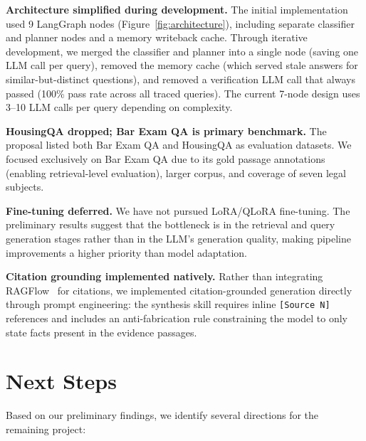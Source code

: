\documentclass{article}
\begin{document}
\textbf{Architecture simplified during development.}
The initial implementation used 9 LangGraph nodes (Figure~\ref{fig:architecture}), including separate classifier and planner nodes and a memory writeback cache. Through iterative development, we merged the classifier and planner into a single node (saving one LLM call per query), removed the memory cache (which served stale answers for similar-but-distinct questions), and removed a verification LLM call that always passed (100\% pass rate across all traced queries). The current 7-node design uses 3--10 LLM calls per query depending on complexity.

\textbf{HousingQA dropped; Bar Exam QA is primary benchmark.}
The proposal listed both Bar Exam QA and HousingQA as evaluation datasets. We focused exclusively on Bar Exam QA due to its gold passage annotations (enabling retrieval-level evaluation), larger corpus, and coverage of seven legal subjects.

\textbf{Fine-tuning deferred.}
We have not pursued LoRA/QLoRA fine-tuning. The preliminary results suggest that the bottleneck is in the retrieval and query generation stages rather than in the LLM's generation quality, making pipeline improvements a higher priority than model adaptation.

\textbf{Citation grounding implemented natively.}
Rather than integrating RAGFlow~\cite{ragflow} for citations, we implemented citation-grounded generation directly through prompt engineering: the synthesis skill requires inline \texttt{[Source~N]} references and includes an anti-fabrication rule constraining the model to only state facts present in the evidence passages.

\section{Next Steps}

Based on our preliminary findings, we identify several directions for the remaining project:
\end{document}

